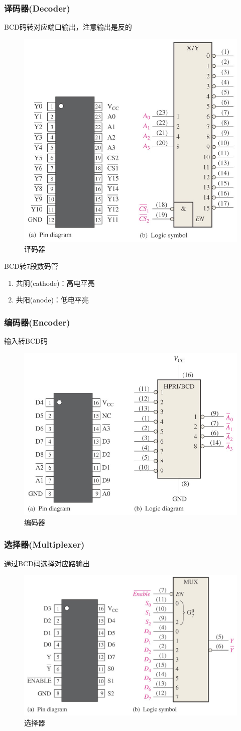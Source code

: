 \subsubsection{译码器(Decoder)}
BCD码转对应端口输出，注意输出是反的
\begin{figure}[htbp]
	\centering
	\includegraphics[width=0.5\linewidth]{fig/decoder.jpg}
	\caption{译码器}
\end{figure}
\par BCD转7段数码管
\begin{enumerate}
	\item 共阴(cathode)：高电平亮
	\item 共阳(anode)：低电平亮
\end{enumerate}
\subsubsection{编码器(Encoder)}
输入转BCD码
\begin{figure}[htbp]
	\centering
	\includegraphics[width=0.6\linewidth]{fig/encoder.jpg}
	\caption{编码器}
\end{figure}
\subsubsection{选择器(Multiplexer)}
通过BCD码选择对应路输出
\begin{figure}[htbp]
	\centering
	\includegraphics[width=0.6\linewidth]{fig/multiplexer.jpg}
	\caption{选择器}
\end{figure}
